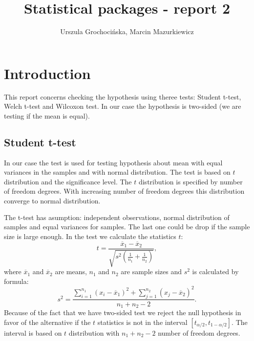 \documentclass{article}
\begin{document}
  
  


\title{Statistical packages - report 2}
\author{Urszula Grochocińska, Marcin Mazurkiewicz}
\maketitle
\tableofcontents 


  \section{Introduction}
This report concerns checking the hypothesis using theree tests: Student t-test, Welch t-test and Wilcoxon test. In our case the hypothesis is two-sided (we are testing if the mean is equal).
  \subsection{Student t-test}
In our case the test is used for testing hypothesis about mean with equal variances in the samples and with normal distribution. The test is based on $t$ distribution and the significance level. The $t$ distribution is specified by number of freedom degrees. With increasing number of freedom degrees this distribution converge to normal distribution.

  The t-test has asumption: independent observations, normal distribution of samples and equal variances for samples. The last one could be drop if the sample size is large enough.
  In the test we calculate the statistics $t$:
  \begin{equation}
  t=\frac{\overline{x}_1-\overline{x}_2}{\sqrt{s^2\left(\frac{1}{n_1}+\frac{1}{n_2}\right)}},
  \end{equation}
where $\overline{x}_1$ and $\overline{x}_2$ are means, $n_1$ and $n_2$ are sample sizes and $s^2$ is calculated by formula:
  \begin{equation}
    s^2=\frac{\sum_{i=1}^{n_1}(x_i-\overline{x}_1)^2+\sum_{j=1}^{n_2}(x_j-\overline{x}_2)^2}{n_1+n_2-2}.
  \end{equation}
Because of the fact that we have two-sided test we reject the null hypothesis in favor of the alternative if the $t$ statistics is not in the interval $[t_{\alpha/2}, t_{1-\alpha/2}]$. The interval is based on $t$ distribution with $n_1+n_2-2$ number of freedom degrees.
\end{document}
